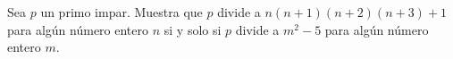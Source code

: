 Sea $p$ un primo impar. Muestra que $p$ divide a $n(n+1)(n+2)(n+3) + 1$ para algún número entero $n$ si y solo si $p$ divide a $m^2 - 5$ para algún número entero $m$. 